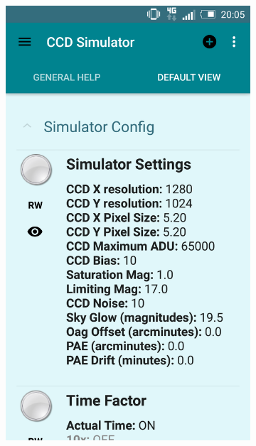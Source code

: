 \begin{figure}
    \centering
    \begin{subfigure}[]{0.4\textwidth}
        \includegraphics[width=\textwidth]{../images/captura12.png}
        \caption{}
        \label{fig:captura10}
    \end{subfigure}
    \begin{subfigure}[]{0.4\textwidth}

\end{subfigure}
\end{figure}
